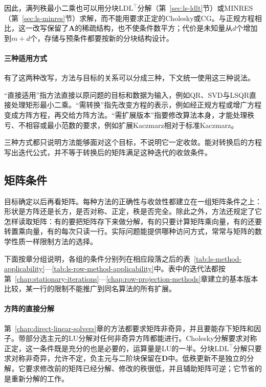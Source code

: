 因此，满列秩最小二乘也可以用分块$\mathrm{LDL}^\top$分解（第~\ref{sec:ls-ldlt}节）或MINRES（第~\ref{sec:ls-minres}节）求解，而不能用要求正定的Cholesky或CG。与正规方程相比，这一改写保留了$\bm A$的稀疏结构，也不使条件数平方；代价是未知量从$d$个增加到$m+d$个，存储与预条件都要按新的分块结构设计。

\paragraph{三种适用方式}
有了这两种改写，方法与目标的关系可以分成三种，下文统一使用这三种说法。

“直接适用”指方法直接以原问题的目标和数据为输入，例如QR、SVD与LSQR直接处理矩形最小二乘。“需转换”指先改变方程的表示，例如经正规方程或增广方程变成方阵方程，再交给方阵方法。“需扩展版本”指要修改算法本身，才能处理秩亏、不相容或最小范数的要求，例如扩展Kaczmarz相对于标准Kaczmarz。

三种方式都只说明方法能够面对这个目标，不说明它一定收敛。能对转换后的方程写出迭代公式，并不等于转换后的矩阵满足这种迭代的收敛条件。

\subsection{矩阵条件}
\label{sec:ls-method-selection-matrix}

目标确定以后再看矩阵。每种方法的正确性与收敛性都建立在一组矩阵条件之上：形状是方阵还是长方，是否对称、正定，秩是否完全。除此之外，方法还规定了它怎样读取矩阵：有的要把矩阵存下来做分解，有的只要计算矩阵乘向量，有的还要转置乘向量，有的每次只读一行。实际问题能提供哪种访问方式，常常与矩阵的数学性质一样限制方法的选择。

下面按章分组说明，各组的条件分别列在相应段落之后的表~\ref{tab:ls-method-applicability}—\ref{tab:ls-row-method-applicability}中。表中的迭代法都按第~\ref{chap:stationary-iterations}—\ref{chap:row-projection-methods}章建立的基本版本比较，某一行的限制不能推广到同名算法的所有扩展。

\paragraph{方阵的直接分解}
第~\ref{chap:direct-linear-solvers}章的方法都要求矩阵非奇异，并且要能存下矩阵和因子。带部分选主元的LU分解对任何非奇异方阵都能进行。Cholesky分解要求对称正定，这一条件既是充分的也是必要的，运算量是LU的一半。分块$\mathrm{LDL}^\top$分解只要求对称非奇异，允许不定，负主元与二阶块保留在$\bm D$中。低秩更新不是独立的分解，它要求修改前的矩阵已经分解、修改的秩很低，并且辅助矩阵可逆；它节省的是重新分解的工作。

